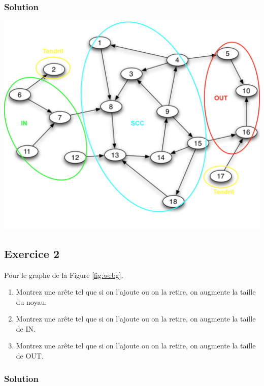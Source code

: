     \subsubsection*{Solution}

    \begin{center}
    \includegraphics[scale=0.5]{figs/TP11Q1.png}
    \end{center}


\subsection*{Exercice 2}
Pour le graphe de la Figure \ref{fig:webg}.
\begin{enumerate}
 \item Montrez une arête tel que si on l'ajoute ou on la retire, on augmente la taille du noyau.
 \item Montrez une arête tel que si on l'ajoute ou on la retire, on augmente la taille de IN.
 \item Montrez une arête tel que si on l'ajoute ou on la retire, on augmente la taille de OUT.
\end{enumerate}

    \subsubsection*{Solution}

